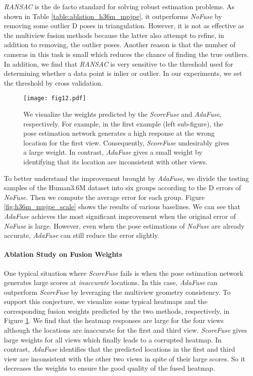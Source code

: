 \emph{RANSAC} is the de facto standard for solving robust estimation problems. As shown in Table \ref{table:ablation_h36m_mpjpe}, it outperforms \emph{NoFuse} by removing some outlier D poses in triangulation. However, it is not as effective as the multiview fusion methods because the latter also attempt to refine, in addition to removing, the outlier poses. Another reason is that the number of cameras in this task is small which reduces the chance of finding the true outliers. In addition, we find that \emph{RANSAC} is very sensitive to the threshold used for determining whether a data point is inlier or outlier. In our experiments, we set the threshold by cross validation.

\begin{figure}[ht]
    \centering
    \texttt{[image: fig12.pdf]}
    \caption{We visualize the weights predicted by the \emph{ScoreFuse} and \emph{AdaFuse}, respectively. For example, in the first example (left sub-figure), the pose estimation network generates a high response at the wrong location for the first view. Consequently, \emph{ScoreFuse} undesirably gives a large weight. In contrast, \emph{AdaFuse} gives a small weight by identifying that its location are inconsistent with other views.}
    \label{fig:h36m_maxv_ours}
\end{figure}


To better understand the improvement brought by \emph{AdaFuse}, we divide the testing samples of the Human3.6M dataset into six groups according to the D errors of \emph{NoFuse}. Then we compute the average error for each group. Figure \ref{fig:h36m_mpjpe_scale} shows the results of various baselines. We can see that \emph{AdaFuse} achieves the most significant improvement when the original error of \emph{NoFuse} is large. However, even when the pose estimations of \emph{NoFuse} are already accurate, \emph{AdaFuse} can still reduce the error slightly.

\paragraph{Ablation Study on Fusion Weights}
One typical situation where \emph{ScoreFuse} fails is when the pose estimation network generates large scores at \emph{inaccurate} locations. In this case, \emph{AdaFuse} can outperform \emph{ScoreFuse} by leveraging the multiview geometry consistency. To support this conjecture, we visualize some typical heatmaps and the corresponding fusion weights predicted by the two methods, respectively, in Figure \ref{fig:h36m_maxv_ours}. We find that the heatmap responses are large for the four views although the locations are inaccurate for the first and third view. \emph{ScoreFuse} gives large weights for all views which finally leads to a corrupted heatmap. In contrast, \emph{AdaFuse} identifies that the predicted locations in the first and third view are inconsistent with the other two views in spite of their large scores. So it decreases the weights to ensure the good quality of the fused heatmap.

